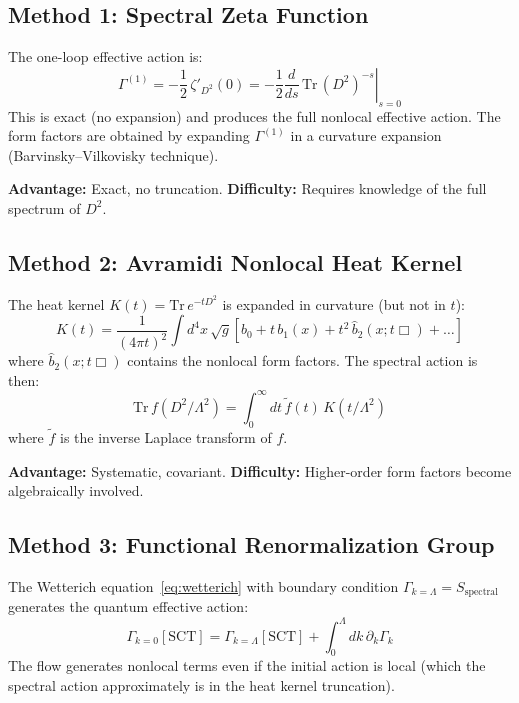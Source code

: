 \documentclass[11pt,a4paper]{article}
\begin{document}
\subsection{Method 1: Spectral Zeta Function}

The one-loop effective action is:
\begin{equation}
  \Gamma^{(1)} = -\frac{1}{2}\,\zeta'_{D^2}(0) = -\frac{1}{2}\left.\frac{d}{ds}\,\mathrm{Tr}\,(D^2)^{-s}\right|_{s=0}
\end{equation}
This is exact (no expansion) and produces the full nonlocal effective action. The form factors are obtained by expanding $\Gamma^{(1)}$ in a curvature expansion (Barvinsky--Vilkovisky technique).

\textbf{Advantage:} Exact, no truncation. \textbf{Difficulty:} Requires knowledge of the full spectrum of $D^2$.

\subsection{Method 2: Avramidi Nonlocal Heat Kernel}

The heat kernel $K(t) = \mathrm{Tr}\,e^{-tD^2}$ is expanded in curvature (but not in $t$):
\begin{equation}
  K(t) = \frac{1}{(4\pi t)^2}\int d^4x\,\sqrt{g}\left[
    b_0 + t\,b_1(x) + t^2\,\hat{b}_2(x; t\Box) + \ldots
  \right]
\end{equation}
where $\hat{b}_2(x; t\Box)$ contains the nonlocal form factors. The spectral action is then:
\begin{equation}
  \mathrm{Tr}\,f(D^2/\Lambda^2) = \int_0^\infty dt\,\tilde{f}(t)\,K(t/\Lambda^2)
\end{equation}
where $\tilde{f}$ is the inverse Laplace transform of $f$.

\textbf{Advantage:} Systematic, covariant. \textbf{Difficulty:} Higher-order form factors become algebraically involved.

\subsection{Method 3: Functional Renormalization Group}

The Wetterich equation~\eqref{eq:wetterich} with boundary condition $\Gamma_{k=\Lambda} = S_{\text{spectral}}$ generates the quantum effective action:
\begin{equation}
  \Gamma_{k=0}[\text{SCT}] = \Gamma_{k=\Lambda}[\text{SCT}] + \int_0^\Lambda dk\,\partial_k\Gamma_k
\end{equation}
The flow generates nonlocal terms even if the initial action is local (which the spectral action approximately is in the heat kernel truncation).
\end{document}
